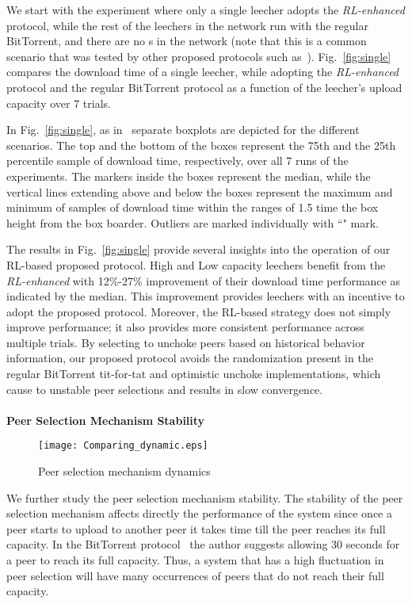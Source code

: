 We start with the experiment where only a single leecher adopts the 
\emph{RL-enhanced} protocol, while the rest of the leechers in the network run with 
the regular BitTorrent, and there are no \FR s in the network (note that this 
is a common scenario that was tested by other proposed protocols such 
as~\cite{levin08, piatek07}). 
Fig.~\ref{fig:single} compares the download time of a single 
leecher, while adopting the \emph{RL-enhanced} protocol and the regular BitTorrent 
protocol as a function of the leecher's upload capacity over 7 trials.

In Fig.~\ref{fig:single}, as in~\cite{mcgill78} separate boxplots are depicted 
for the different scenarios. The top and the bottom of the boxes represent the 
75th and the 25th percentile sample of download time, respectively, over all 7 
runs of the experiments. The markers inside the boxes represent the median, 
while the vertical lines extending above and below the boxes represent the 
maximum and minimum of samples of download time within the ranges of 1.5 time 
the box height from the box boarder. Outliers are marked individually with 
``" mark.

The results in Fig.~\ref{fig:single} provide several insights into the 
operation of our RL-based proposed protocol.
High and Low capacity leechers benefit from the \emph{RL-enhanced} with 12\%-27\%
improvement of their download time performance as indicated by the median.
This improvement provides leechers with an incentive to adopt the proposed 
protocol. Moreover, the RL-based strategy does not simply improve 
performance; it also provides more consistent performance across multiple 
trials. By selecting to unchoke peers based on historical behavior information, 
our proposed protocol avoids the randomization present in the regular BitTorrent 
tit-for-tat and optimistic unchoke implementations, which cause to unstable 
peer selections and results in slow convergence.\\
\\{\bfseries Peer Selection Mechanism Stability}
\begin{figure}[t]
\centering
\texttt{[image: Comparing\_dynamic.eps]}
\caption{Peer selection mechanism dynamics} 
\label{fig:dynamics}
\end{figure}
We further study the peer selection mechanism stability.
The stability of the peer selection mechanism affects directly the performance 
of the system since once a peer starts to upload to another peer it takes time 
till the peer reaches its full capacity. In the BitTorrent 
protocol~\cite{cohen03} the author suggests allowing 30 seconds for a peer to 
reach its full capacity. 
Thus, a system that has a high fluctuation in peer selection will have many 
occurrences of peers that do not reach their full capacity.

